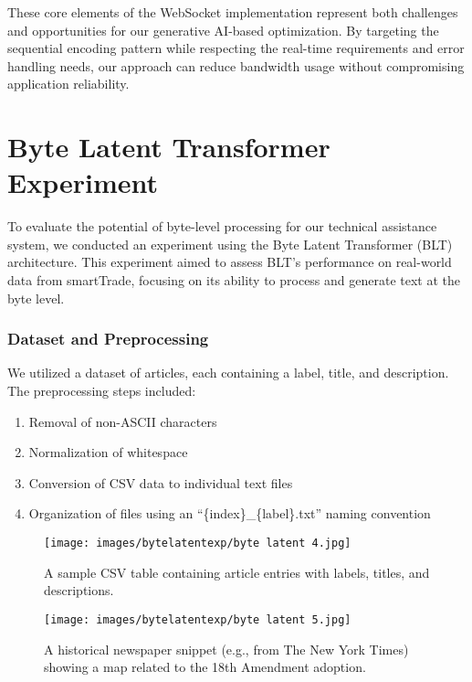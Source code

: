 \documentclass[a4paper, 11pt, twoside, openright]{report}
\begin{document}
These core elements of the WebSocket implementation represent both challenges and opportunities for our generative AI-based optimization. By targeting the sequential encoding pattern while respecting the real-time requirements and error handling needs, our approach can reduce bandwidth usage without compromising application reliability.

\section{Byte Latent Transformer Experiment}

To evaluate the potential of byte-level processing for our technical assistance system, we conducted an experiment using the Byte Latent Transformer (BLT) architecture. This experiment aimed to assess BLT's performance on real-world data from smartTrade, focusing on its ability to process and generate text at the byte level.

\subsubsection{Dataset and Preprocessing}

We utilized a dataset of articles, each containing a label, title, and description. The preprocessing steps included:

\begin{enumerate}[label=\arabic*.]
    \item Removal of non-ASCII characters
    \item Normalization of whitespace
    \item Conversion of CSV data to individual text files
    \item Organization of files using an ``\{index\}\_\{label\}.txt'' naming convention
\end{enumerate}

\begin{figure}[h!]
\centering
\texttt{[image: images/bytelatentexp/byte latent 4.jpg]}
\caption{A sample CSV table containing article entries with labels, titles, and descriptions.}
\label{fig:dataset_csv}
\end{figure}

\begin{figure}[h!]
\centering
\texttt{[image: images/bytelatentexp/byte latent 5.jpg]}
\caption{A historical newspaper snippet (e.g., from The New York Times) showing a map related to the 18th Amendment adoption.}
\label{fig:newspaper_snippet}
\end{figure}
\end{document}
